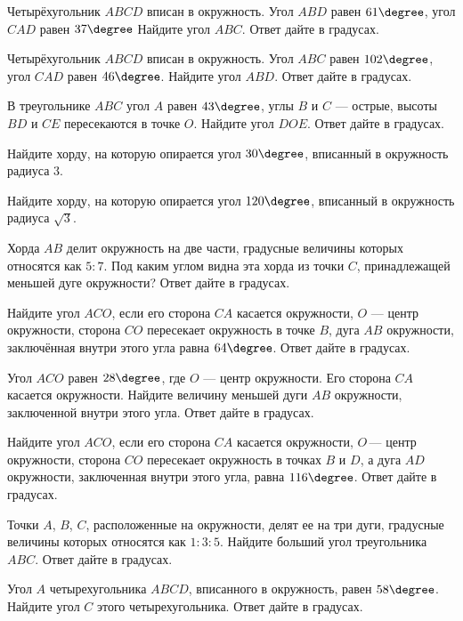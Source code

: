 \begin{class}[number=5]
	\begin{listofex}
		\item Четырёхугольник \( ABCD \) вписан в окружность. Угол \( ABD \) равен \( 61\degree \), угол \( CAD \) равен \( 37\degree \) Найдите угол \( ABC \). Ответ дайте в градусах.
		\item Четырёхугольник \( ABCD \) вписан в окружность. Угол \( ABC \) равен \( 102\degree \), угол \( CAD  \) равен \( 46\degree \). Найдите угол \( ABD \). Ответ дайте в градусах.
		\item В треугольнике \( ABC \) угол \( A \) равен \( 43\degree \), углы \( B \) и \( C \) --- острые, высоты \( BD \) и \( CE \) пересекаются в точке \( O \). Найдите угол \( DOE \). Ответ дайте в градусах.
		\item Найдите хорду, на которую опирается угол \( 30\degree \), вписанный в окружность радиуса \( 3 \).
		\item Найдите хорду, на которую опирается угол \( 120\degree \), вписанный в окружность радиуса \( \sqrt{3} \).
		\item Хорда \( AB \) делит окружность на две части, градусные величины которых относятся как \( 5:7 \). Под каким углом видна эта хорда из точки \( C \), принадлежащей меньшей дуге окружности? Ответ дайте в градусах.
		\item Найдите угол \( ACO \), если его сторона \( CA \) касается окружности, \( O \) --- центр окружности, сторона \( CO \) пересекает окружность в точке \( B \), дуга \( AB \) окружности, заключённая внутри этого угла равна \( 64\degree \). Ответ дайте в градусах.
		\item Угол \( ACO \) равен \( 28\degree \), где \( O \) --- центр окружности. Его сторона \( CA \) касается окружности. Найдите величину меньшей дуги \( AB \) окружности, заключенной внутри этого угла. Ответ дайте в градусах.
		\item Найдите угол \( ACO \), если его сторона \( CA \) касается окружности, \( O \) --- центр окружности, сторона \( CO \) пересекает окружность в точках \( B \) и \( D \), а дуга \( AD \) окружности, заключенная внутри этого угла, равна \( 116\degree \). Ответ дайте в градусах.
		\item Точки \( A \), \( B \), \( C \), расположенные на окружности, делят ее на три дуги, градусные величины которых относятся как \( 1:3:5 \). Найдите больший угол треугольника \( ABC \). Ответ дайте в градусах.
		\item Угол \( A \) четырехугольника \( ABCD \), вписанного в окружность, равен \( 58\degree \). Найдите угол \( C \) этого четырехугольника. Ответ дайте в градусах.

\end{listofex}
\end{class}
